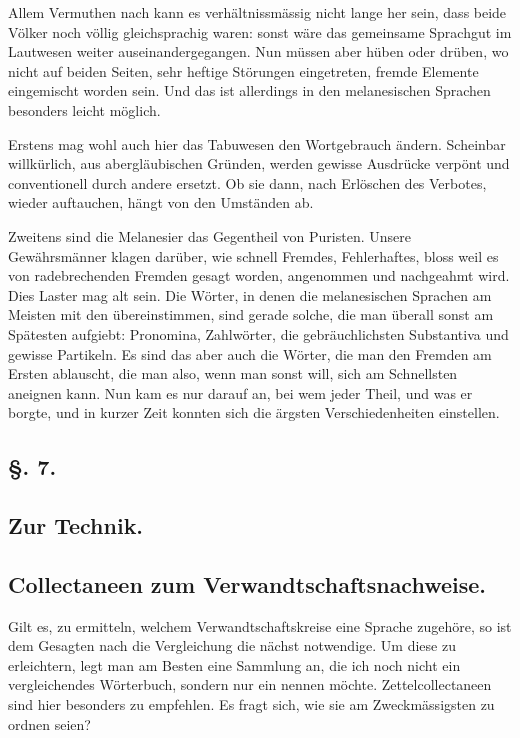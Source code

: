 Allem Vermuthen nach kann es verhältnissmässig nicht lange her sein, dass beide Völker noch völlig gleichsprachig waren: sonst wäre das gemeinsame Sprachgut im Lautwesen weiter auseinandergegangen. Nun müssen aber hüben oder drüben, wo nicht auf beiden Seiten, sehr heftige Störungen eingetreten, fremde Elemente eingemischt worden sein. Und das ist allerdings in den melanesischen Sprachen besonders leicht möglich.

\label{sp.166}

Erstens mag wohl auch hier das Tabuwesen den Wortgebrauch ändern. Scheinbar willkürlich, aus abergläubischen Gründen, werden gewisse Ausdrücke verpönt und conventionell durch andere ersetzt. Ob sie dann, nach Erlöschen des Verbotes, wieder auftauchen, hängt von den Umständen ab.

Zweitens sind die Melanesier das Gegentheil von Puristen. Unsere Gewährsmänner klagen darüber, wie schnell Fremdes, Fehlerhaftes, bloss weil es von radebrechenden Fremden gesagt worden, angenommen und \label{fp.177} nachgeahmt wird. Dies Laster mag alt sein. Die Wörter, in denen die melanesischen Sprachen am Meisten mit den  übereinstimmen, sind gerade solche, die man überall sonst am Spätesten aufgiebt: Pronomina, Zahlwörter, die gebräuchlichsten Substantiva und gewisse Partikeln. Es sind das aber auch die Wörter, die man den Fremden am Ersten ablauscht, die man also, wenn man sonst will, sich am Schnellsten aneignen kann. Nun kam es nur darauf an, bei wem jeder Theil, und was er borgte, und in kurzer Zeit konnten sich die ärgsten Verschiedenheiten einstellen.

\subsection*{§. 7.}\label{III.I.I.7}
\subsection*{Zur Technik.}
\subsection*{Collectaneen zum Verwandtschaftsnachweise.}
Gilt es, zu ermitteln, welchem Verwandtschaftskreise eine Sprache zugehöre, so ist dem Gesagten nach die  Vergleichung die nächst notwendige. Um diese zu erleichtern, legt man am Besten eine Sammlung an, die ich noch nicht ein vergleichendes Wörterbuch, sondern nur ein  nennen möchte. Zettelcollectaneen sind hier besonders zu empfehlen. Es fragt sich, wie sie am Zweckmässigsten zu ordnen seien?

